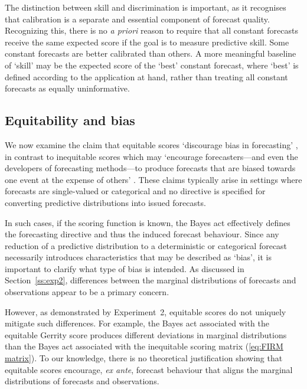 \documentclass[10pt]{article} %
\theoremstyle{theorem}
\theoremstyle{definition}
\begin{document}
The distinction between skill and discrimination is important, as it recognises that calibration is a separate and essential component of forecast quality.
Recognizing this, there is no \textit{a priori} reason to require that all constant forecasts receive the same expected score if the goal is to measure predictive skill. Some constant forecasts are better calibrated than others. A more meaningful baseline of `skill' may be the expected score of the `best' constant forecast, where `best' is defined according to the application at hand, rather than treating all constant forecasts as equally uninformative.

\subsection{Equitability and bias}\label{ss:bias}

We now examine the claim that equitable scores `discourage bias in forecasting' \citep{rodwell2010new}, in contrast to inequitable scores which may `encourage forecasters---and even the developers of forecasting methods---to produce forecasts that are biased towards one event at the expense of others' \citep{gandin1992equitable}. These claims typically arise in settings where forecasts are single-valued or categorical and no directive is specified for converting predictive distributions into issued forecasts.

In such cases, if the scoring function is known, the Bayes act effectively defines the forecasting directive and thus the induced forecast behaviour. Since any reduction of a predictive distribution to a deterministic or categorical forecast necessarily introduces characteristics that may be described as `bias', it is important to clarify what type of bias is intended. As discussed in Section~\ref{ss:exp2}, differences between the marginal distributions of forecasts and observations appear to be a primary concern.

However, as demonstrated by Experiment~2, equitable scores do not uniquely mitigate such differences. For example, the Bayes act associated with the equitable Gerrity score produces different deviations in marginal distributions than the Bayes act associated with the inequitable scoring matrix (\ref{eq:FIRM matrix}). To our knowledge, there is no theoretical justification showing that equitable scores encourage, \textit{ex ante}, forecast behaviour that aligns the marginal distributions of forecasts and observations.
\end{document}

